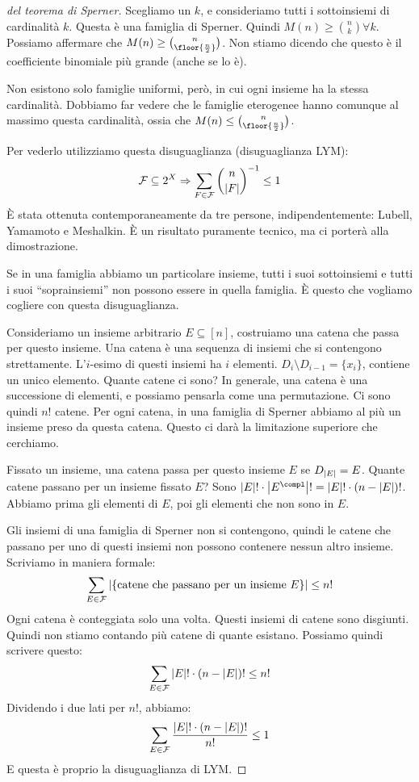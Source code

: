 \begin{proof}[del teorema di Sperner]
	Scegliamo un $k$, e consideriamo tutti i sottoinsiemi di cardinalit\`a $k$.
	Questa \`e una famiglia di Sperner.
	Quindi $M(n) \ge \binom{n}{k} \forall k$.
	Possiamo affermare che $M(n) \ge \binom{n}{\floor{\frac{n}{2}}}$.
	Non stiamo dicendo che questo \`e il coefficiente binomiale pi\`u grande (anche se lo \`e).

	Non esistono solo famiglie uniformi, per\`o, in cui ogni insieme ha la stessa cardinalit\`a.
	Dobbiamo far vedere che le famiglie eterogenee hanno comunque al massimo questa cardinalit\`a, ossia che $M(n) \le \binom{n}{\floor{\frac{n}{2}}}$.

	Per vederlo utilizziamo questa disuguaglianza (disuguaglianza LYM):
	\[
		\mathcal{F} \subseteq 2^X \Rightarrow \sum_{F \in \mathcal{F}} \binom{n}{\left\lvert{F}\right\rvert}^{-1} \le 1
	\]
	\`E stata ottenuta contemporaneamente da tre persone, indipendentemente: Lubell, Yamamoto e Meshalkin.
	\`E un risultato puramente tecnico, ma ci porter\`a alla dimostrazione.

	Se in una famiglia abbiamo un particolare insieme, tutti i suoi sottoinsiemi e tutti i suoi ``soprainsiemi'' non possono essere in quella famiglia.
	\`E questo che vogliamo cogliere con questa disuguaglianza.

	Consideriamo un insieme arbitrario $E \subseteq [n]$, costruiamo una catena che passa per questo insieme.
	Una catena \`e una sequenza di insiemi che si contengono strettamente.
	L'$i$-esimo di questi insiemi ha $i$ elementi.
	$D_i \setminus D_{i-1} = \{ x_i \}$, contiene un unico elemento.
	Quante catene ci sono?
	In generale, una catena \`e una successione di elementi, e possiamo pensarla come una permutazione.
	Ci sono quindi $n!$ catene.
	Per ogni catena, in una famiglia di Sperner abbiamo al pi\`u un insieme preso da questa catena.
	Questo ci dar\`a la limitazione superiore che cerchiamo.

	Fissato un insieme, una catena passa per questo insieme $E$ se $D_{\left\lvert{E}\right\rvert} = E$.
	Quante catene passano per un insieme fissato $E$?
	Sono $\abs{E}! \cdot \abs{E^{\compl}}! = \abs{E}! \cdot (n - \abs{E})!$.
	Abbiamo prima gli elementi di $E$, poi gli elementi che non sono in $E$.

	Gli insiemi di una famiglia di Sperner non si contengono, quindi le catene che passano per uno di questi insiemi non possono contenere nessun altro insieme.
	Scriviamo in maniera formale:
	\[
		\sum_{E \in \mathcal{F}} \left\lvert{\{ \text{catene che passano per un insieme } E \}}\right\rvert \le n!
	\]
	Ogni catena \`e conteggiata solo una volta.
	Questi insiemi di catene sono disgiunti.
	Quindi non stiamo contando pi\`u catene di quante esistano.
	Possiamo quindi scrivere questo:
	\[
		\sum_{E \in \mathcal{F}} \left\lvert{E}\right\rvert! \cdot (n - \left\lvert{E}\right\rvert)! \le n!
	\]
	Dividendo i due lati per $n!$, abbiamo:
	\[
		\sum_{E \in \mathcal{F}} \frac{\left\lvert{E}\right\rvert! \cdot (n - \left\lvert{E}\right\rvert)!}{n!} \le 1
	\]
	E questa \`e proprio la disuguaglianza di LYM.


\end{proof}
